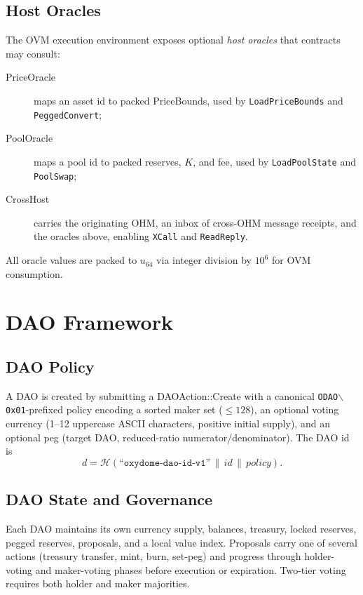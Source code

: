 \documentclass[11pt,a4paper]{article}
\theoremstyle{definition}
\newcommand{\ohm}{\textsf{OH\scriptsize M}}\newcommand{\evk}{\textsf{EVK}}
\newcommand{\ovm}{\textsf{OVM}}
\newcommand{\DAOAction}{\textsf{DAOAction}}
\newcommand{\PriceBounds}{\textsf{PriceBounds}}
\newcommand{\hash}{\mathcal{H}}
\begin{document}
\subsection{Host Oracles}

The \ovm{} execution environment exposes optional \emph{host oracles} that
contracts may consult:
\begin{description}
  \item[PriceOracle] maps an asset id to packed \PriceBounds, used by
    \texttt{LoadPriceBounds} and \texttt{PeggedConvert};
  \item[PoolOracle] maps a pool id to packed reserves, $K$, and fee, used by
    \texttt{LoadPoolState} and \texttt{PoolSwap};
  \item[CrossHost] carries the originating \ohm{}, an inbox of cross-\ohm
    message receipts, and the oracles above, enabling \texttt{XCall} and
    \texttt{ReadReply}.
\end{description}
All oracle values are packed to $u_{64}$ via integer division by $10^6$ for
\ovm{} consumption.

\section{DAO Framework}
\label{sec:dao}

\subsection{DAO Policy}

A DAO is created by submitting a \DAOAction::Create with a canonical
\texttt{ODAO$\backslash$0x01}-prefixed policy encoding a sorted maker set
($\le 128$), an optional voting currency (1--12 uppercase ASCII characters,
positive initial supply), and an optional peg (target DAO, reduced-ratio
numerator/denominator).  The DAO id is
\[
d = \hash(\texttt{``oxydome-dao-id-v1''}\,\|\,\mathit{id}\,\|\,\mathit{policy}).
\]

\subsection{DAO State and Governance}

Each DAO maintains its own currency supply, balances, treasury, locked
reserves, pegged reserves, proposals, and a local value index.  Proposals
carry one of several actions (treasury transfer, mint, burn, set-peg) and
progress through holder-voting and maker-voting phases before execution or
expiration.  Two-tier voting requires both holder and maker majorities.
\end{document}
